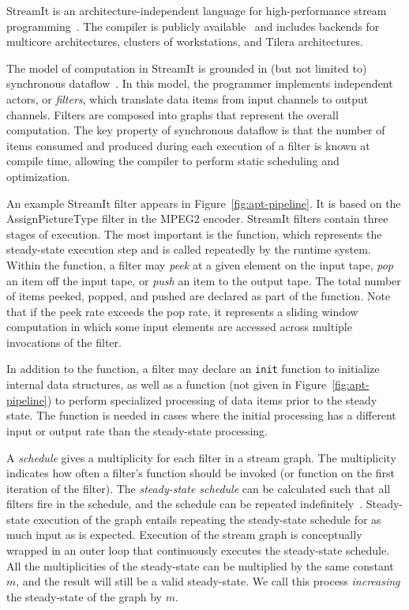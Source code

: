 StreamIt is an architecture-independent language for high-perf\-ormance
stream programming~\cite{streamitcc}.  The compiler is publicly
available~\cite{streamitweb} and includes backends for multicore
architectures, clusters of workstations, and Tilera architectures.

The model of computation in StreamIt is grounded in (but not limited
to) synchronous dataflow~\cite{lee87}.  In this model, the programmer
implements independent actors, or {\it filters}, which translate data
items from input channels to output channels.  Filters are composed
into graphs that represent the overall computation.  The key property
of synchronous dataflow is that the number of items consumed and
produced during each execution of a filter is known at compile time,
allowing the compiler to perform static scheduling and optimization.

An example StreamIt filter appears in Figure~\ref{fig:apt-pipeline}.
It is based on the AssignPictureType filter in the MPEG2 encoder.
StreamIt filters contain three stages of execution.  The most
important is the \work function, which represents the
steady-state execution step and is called repeatedly by the runtime
system.  Within the \work function, a filter may {\it peek} at a given
element on the input tape, {\it pop} an item off the input tape, or
{\it push} an item to the output tape.  The total number of items
peeked, popped, and pushed are declared as part of the \work function.
Note that if the peek rate exceeds the pop rate, it represents a
sliding window computation in which some input elements are accessed
across multiple invocations of the filter.


In addition to the \work function, a filter may declare an {\tt init}
function to initialize internal data structures, as well as a 
 \prework function (not given in Figure~\ref{fig:apt-pipeline}) to
perform specialized processing of data items prior to the steady
state.  The \prework function is needed in cases where the initial
processing has a different input or output rate than the steady-state
processing.

A {\it schedule} gives a multiplicity for each filter in a stream
graph.  The multiplicity indicates how often a filter's \work function
should be invoked (or \prework function on the first iteration of the filter).  The
{\it steady-state schedule} can be calculated such that all filters
fire in the schedule, and the schedule can be repeated
indefinitely~\cite{lee87}.  Steady-state execution of the graph
entails repeating the steady-state schedule for as much input as is
expected.  Execution of the stream graph is conceptually wrapped in an
outer loop that continuously executes the steady-state schedule.  All
the multiplicities of the steady-state can be multiplied by the same
constant $m$, and the result will still be a valid steady-state.  We
call this process {\it increasing} the steady-state of the graph by
$m$.

